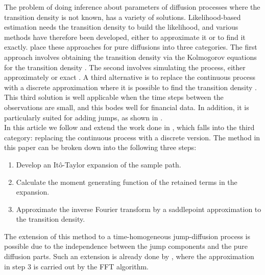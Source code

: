 The problem of doing inference about parameters of diffusion processes where the transition density is not known, has a variety of solutions. 
Likelihood-based estimation needs the transition density to build the likelihood, and various methods have therefore been developed, either to approximate it or to find it exactly.
\citet{preston2012approximation} place these approaches for pure diffusions into three categories.
The first approach involves obtaining the transition density via the Kolmogorov equations for the transition density \citep{lindstrom2007estimating}.
The second involves simulating the process, either approximately \citep{durham2002numerical} or exact \citep{beskos2006exact}.
A third alternative is to replace the continuous process with a discrete approximation where it is possible to find the transition density \citep{shoji1998estimation, ait1999transition}. 
This third solution is well applicable when the time steps between the observations are small, and this bodes well for financial data. In addition, it is particularly suited for adding jumps, as shown in \citet{zhang2016approximation}.\\

In this article we follow and extend the work done in \citet{preston2012approximation}, which falls into the third category: replacing the continuous process with a discrete version. The method in this paper can be broken down into the following three steps:
\begin{enumerate}
	\item Develop an Itô-Taylor expansion of the sample path.
	\item Calculate the moment generating function of the retained terms in the expansion.
	\item Approximate the inverse Fourier transform by a saddlepoint approximation to the transition density.
\end{enumerate}
The extension of this method to a time-homogeneous jump-diffusion process is possible due to the independence between the jump components and the pure diffusion parts.
Such an extension is already done by \citet{zhang2016approximation}, where the approximation in step 3 is carried out by the FFT algorithm.

